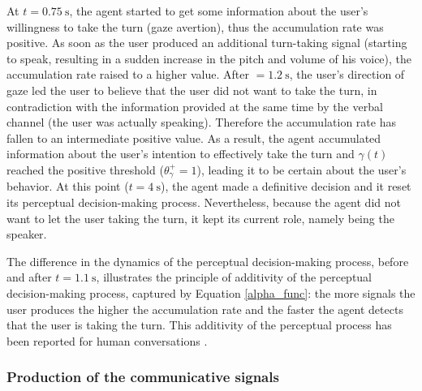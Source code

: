 At $t=0.75~\text{s}$, the agent started to get some information about the user's willingness to take the turn (gaze avertion), thus the accumulation rate was positive. 
As soon as the user produced an additional turn-taking signal (starting to speak, resulting in a sudden increase in the pitch and volume of his voice), the accumulation rate raised to a higher value. 
After $=1.2~\text{s}$, the user's direction of gaze led the user to believe that the user did not want to take the turn, in contradiction with the information provided at the same time by the verbal channel (the user was actually speaking). Therefore the accumulation rate has fallen to an intermediate positive value. 
As a result, the agent accumulated information about the user's intention to effectively take the turn and $\gamma(t)$ reached the positive threshold ($\theta_{\gamma}^{+}=1$), leading it to be certain about the user's behavior. At this point ($t=4~\text{s}$), the agent made a definitive decision and it reset its perceptual decision-making process. 
Nevertheless, because the agent did not want to let the user taking the turn, it kept its current role, namely being the speaker. 


The  difference in the dynamics of the perceptual decision-making process, before and after $t=1.1~\text{s}$, illustrates the principle of additivity of the perceptual decision-making process, captured by Equation \ref{alpha_func}: the more signals the user produces
 the higher the accumulation rate and the faster the agent detects that the user is taking the turn. This additivity of the perceptual process has been reported for human conversations \citep{gravano_turn-taking_2011,hjalmarsson_additive_2011}. 

\subsubsection{Production of the communicative signals}

